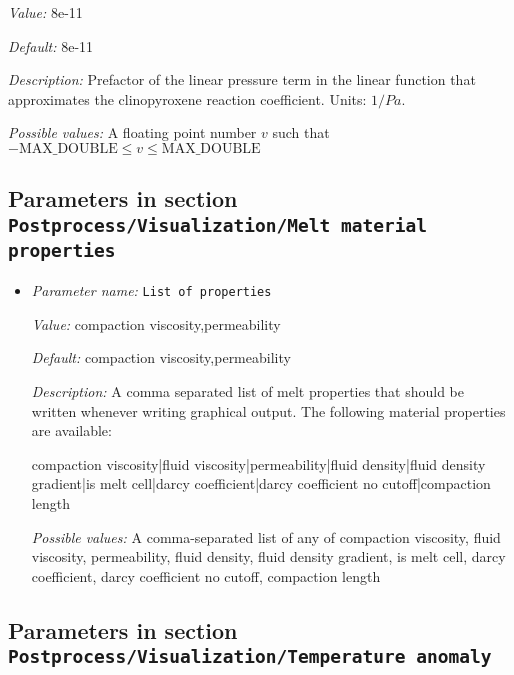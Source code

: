 \begin{itemize}
{\it Value:} 8e-11


{\it Default:} 8e-11


{\it Description:} Prefactor of the linear pressure term in the linear function that approximates the clinopyroxene reaction coefficient. Units: $1/Pa$.


{\it Possible values:} A floating point number $v$ such that $-\text{MAX\_DOUBLE} \leq v \leq \text{MAX\_DOUBLE}$
\end{itemize}

\subsection{Parameters in section \tt Postprocess/Visualization/Melt material properties}
\label{parameters:Postprocess/Visualization/Melt_20material_20properties}

\begin{itemize}
\item {\it Parameter name:} {\tt List of properties}
\label{parameters:Postprocess/Visualization/Melt material properties/List of properties}
\label{parameters:Postprocess/Visualization/Melt_20material_20properties/List_20of_20properties}


{\it Value:} compaction viscosity,permeability


{\it Default:} compaction viscosity,permeability


{\it Description:} A comma separated list of melt properties that should be written whenever writing graphical output. The following material properties are available:

compaction viscosity|fluid viscosity|permeability|fluid density|fluid density gradient|is melt cell|darcy coefficient|darcy coefficient no cutoff|compaction length


{\it Possible values:} A comma-separated list of any of compaction viscosity, fluid viscosity, permeability, fluid density, fluid density gradient, is melt cell, darcy coefficient, darcy coefficient no cutoff, compaction length
\end{itemize}

\subsection{Parameters in section \tt Postprocess/Visualization/Temperature anomaly}
\label{parameters:Postprocess/Visualization/Temperature_20anomaly}

